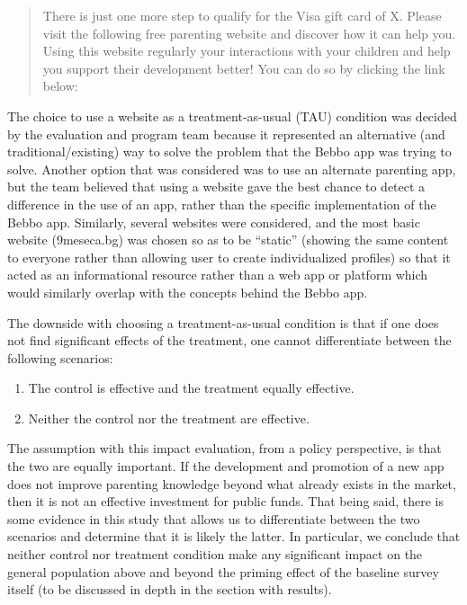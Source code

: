\documentclass{article}
\begin{document}
\begin{quote}

There is just one more step to qualify for the Visa gift card of X. Please visit the following free parenting website and discover how it can help you. Using this website regularly  your interactions with your children and help you support their development better! You can do so by clicking the link below:
\end{quote}

The choice to use a website as a treatment-as-usual (TAU) condition was decided by the evaluation and program team because it represented an alternative (and traditional/existing) way to solve the problem that the Bebbo app was trying to solve. Another option that was considered was to use an alternate parenting app, but the team believed that using a website gave the best chance to detect a difference in the use of an app, rather than the specific implementation of the Bebbo app. Similarly, several websites were considered, and the most basic website (9meseca.bg) was chosen so as to be ``static'' (showing the same content to everyone rather than allowing user to create individualized profiles) so that it acted as an informational resource rather than a web app or platform which would similarly overlap with the concepts behind the Bebbo app.

The downside with choosing a treatment-as-usual condition is that if one does not find significant effects of the treatment, one cannot differentiate between the following scenarios:

\begin{enumerate}
    \item The control is effective and the treatment equally effective.
    \item Neither the control nor the treatment are effective.
\end{enumerate}

The assumption with this impact evaluation, from a policy perspective, is that the two are equally important. If the development and promotion of a new app does not improve parenting knowledge beyond what already exists in the market, then it is not an effective investment for public funds. That being said, there is some evidence in this study that allows us to differentiate between the two scenarios and determine that it is likely the latter. In particular, we conclude that neither control nor treatment condition make any significant impact on the general population above and beyond the priming effect of the baseline survey itself (to be discussed in depth in the section with results).
\end{document}
